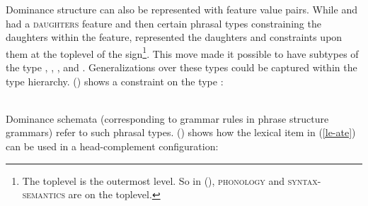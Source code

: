 \documentclass[output=paper]{langsci/langscibook}
\begin{document}
Dominance structure can also be represented with feature value pairs. While \citet{ps} and
\citet{ps2} had a \textsc{daughters} feature and then certain phrasal types constraining the
daughters within the \dtrs feature, \citet{Sag97a} represented the daughters and constraints upon them at
the toplevel of the sign\footnote{
The toplevel is the outermost level. So in (), \textsc{phonology} and
\textsc{syntax-semantics} are on the toplevel.}. 
This move made it possible to have subtypes of the type , \eg
{}, , and
. Generalizations over these types could be captured within the type
hierarchy. () shows a constraint on the type :

\ea
\label{schema-bin-prel}
 \impl\\
\z
Dominance schemata (corresponding to grammar rules in phrase structure grammars) refer to such
phrasal types. () shows how the lexical item in (\ref{le-ate}) can be used in a
head-complement configuration:
\end{document}
